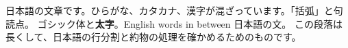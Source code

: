 \documentclass{article}
\begin{document}
日本語の文章です。ひらがな、カタカナ、漢字が混ざっています。「括弧」と句読点。
\textsf{ゴシック体}と\textbf{太字}。English words in between 日本語の文。
この段落は長くして、日本語の行分割と約物の処理を確かめるためのものです。
\end{document}
